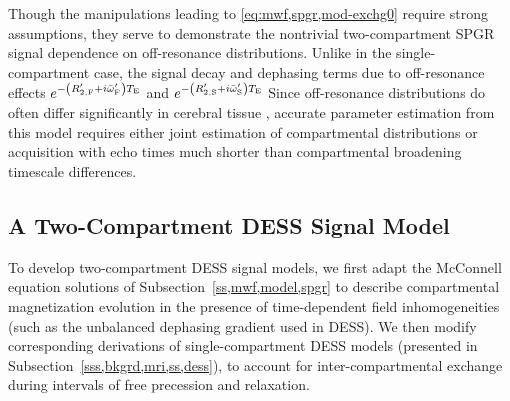 Though the manipulations leading
to \eqref{eq:mwf,spgr,mod-exchg0} require strong assumptions,
they serve to demonstrate 
the nontrivial two-compartment SPGR signal dependence
on off-resonance distributions.
Unlike in the single-compartment case,
the signal decay and dephasing terms
due to off-resonance effects
$e^{-\paren{\Rtpf+i\ompfmed}\TE}$ and $e^{-\paren{\Rtps+i\ompsmed}\TE}$
%
Since off-resonance distributions
do often differ significantly in cerebral tissue
\cite{miller:10:aot-1, miller:10:aot-2}, 
accurate \invivo parameter estimation
from this model 
requires either joint estimation
of compartmental distributions
or acquisition with echo times much shorter
than compartmental broadening timescale differences. 

\subsection{A Two-Compartment DESS Signal Model}
\label{ss,mwf,model,dess}

To develop two-compartment DESS signal models,
we first adapt the McConnell equation solutions
of Subsection~\ref{ss,mwf,model,spgr}
to describe compartmental magnetization evolution
in the presence of time-dependent field inhomogeneities
(such as the unbalanced dephasing gradient used in DESS).
We then modify corresponding derivations
of single-compartment DESS models
(presented in Subsection~\ref{sss,bkgrd,mri,ss,dess}),
to account for inter-compartmental exchange 
during intervals of free precession and relaxation.

